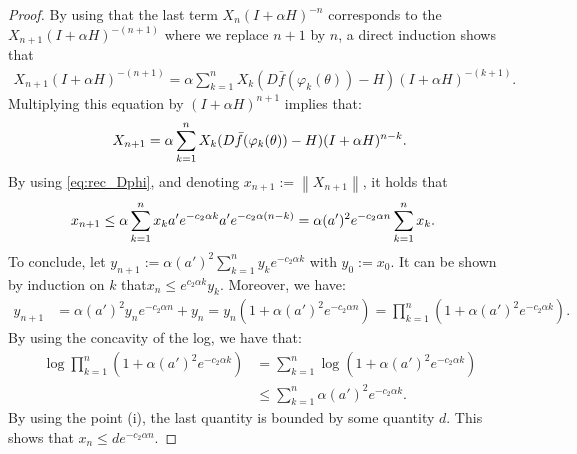 \documentclass{article}
\newcommand\norm[1]{\left\|#1\right\|}
\begin{document}
\begin{proof}
    By using that the last term $X_{n}(I+\alpha H)^{-n}$ corresponds to the $X_{n+1}(I+\alpha H)^{-(n+1)}$ where we replace $n+1$ by $n$, a direct induction shows that
    \begin{align*}
        X_{n+1}(I+\alpha H)^{-(n+1)} = \alpha \sum_{k=1}^n X_k (D\bar{f}(\varphi_k(\theta)) - H)(I+\alpha H)^{-(k+1)}.
    \end{align*}
    Multiplying this equation by $(I+\alpha H)^{n+1}$ implies that:
    \begin{align}
        \label{eq:X_{n+1}}
        X_{n+1} = \alpha \sum_{k=1}^n  X_k (D\bar{f}(\varphi_k(\theta)) - H)(I+\alpha H)^{n-k}.
    \end{align}
    By using \eqref{eq:rec_Dphi}, and denoting $x_{n+1}:=\norm{X_{n+1}}$, it holds that
    \begin{align}
        \label{eq:x_{n+1}}
        x_{n+1} \le \alpha \sum_{k=1}^n x_k a' e^{-c_2\alpha k} a' e^{-c_2\alpha(n-k)}
        &= \alpha (a')^2 e^{-c_2\alpha n} \sum_{k=1}^n x_k.
    \end{align}
    To conclude, let $y_{n+1}:=\alpha (a')^2 \sum_{k=1}^n y_ke^{-c_2\alpha k}$ with $y_0:=x_0$. It can be shown by induction on $k$ that$x_{n}\le e^{c_2\alpha k} y_k$. Moreover, we have:
    \begin{align*}
        y_{n+1} &= \alpha (a')^2 y_n e^{-c_2\alpha n} + y_n = y_n(1+\alpha (a')^2 e^{-c_2\alpha n}) = \prod_{k=1}^n (1+\alpha (a')^2 e^{-c_2\alpha k}).
    \end{align*}
    By using the concavity of the log, we have that:
    \begin{align*}
        \log \prod_{k=1}^n (1+\alpha (a')^2 e^{-c_2\alpha k}) &= \sum_{k=1}^n \log (1+\alpha (a')^2 e^{-c_2\alpha k})\\
        &\le \sum_{k=1}^n \alpha (a')^2 e^{-c_2\alpha k}.
    \end{align*}
    By using the point (i), the last quantity is bounded by some quantity $d$. This shows that $x_n\le de^{-c_2 \alpha n}$.
    

\end{proof}
\end{document}
